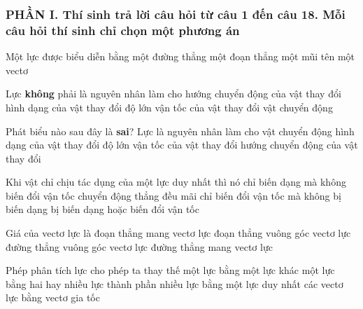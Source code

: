 \subsubsection*{PHẦN I. Thí sinh trả lời câu hỏi từ câu 1 đến câu 18. Mỗi câu hỏi thí sinh chỉ chọn một phương án}
\setcounter{ex}{0}

\begin{ex}%
Một lực được biểu diễn bằng
\choice
{một đường thẳng}
{một đoạn thẳng}
{một mũi tên}
{\True một vectơ}
 \end{ex}


\begin{ex}%
Lực \textbf{không} phải là nguyên nhân làm cho
\choice
{hướng chuyển động của vật thay đổi}
{hình dạng của vật thay đổi}
{độ lớn vận tốc của vật thay đổi}
{\True vật chuyển động}
\end{ex}
\begin{ex}%
Phát biểu nào sau đây là \textbf{sai}? Lực là nguyên nhân làm cho
\choice
{\True vật chuyển động}
{hình dạng của vật thay đổi}
{độ lớn vận tốc của vật thay đổi}
{hướng chuyển động của vật thay đổi}
 \end{ex}
\begin{ex}%
Khi vật chỉ chịu tác dụng của một lực duy nhất thì nó
\choice
{chỉ biến dạng mà không biến đổi vận tốc}
{chuyển động thẳng đều mãi}
{chỉ biến đổi vận tốc mà không bị biến dạng}
{\True bị biến dạng hoặc biến đổi vận tốc}
 \end{ex}

\begin{ex}%
Giá của vectơ lực là
\choice
{đoạn thẳng mang vectơ lực}
{đoạn thẳng vuông góc vectơ lực}
{đường thẳng vuông góc vectơ lực}
{\True đường thẳng mang vectơ lực}
 \end{ex}
\begin{ex}%
Phép phân tích lực cho phép ta thay thế
\choice
{một lực bằng một lực khác}
{\True một lực bằng hai hay nhiều lực thành phần}
{nhiều lực bằng một lực duy nhất}
{các vectơ lực bằng vectơ gia tốc}
 \end{ex}

